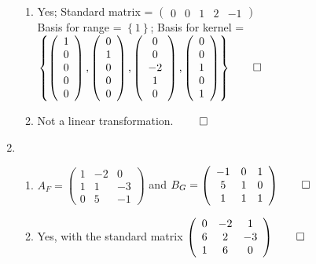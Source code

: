 \documentclass[12pt, a4paper]{article}
\begin{document}
\begin{enumerate}[Q\arabic*.]
\begin{enumerate}[(\alph*)]
      \item Yes; Standard matrix = $\left(\begin{array}{ccccc} 0&0&1&2&-1 \end{array}\right)$\\ Basis for range = $\left\{ 1\right\}$; Basis for kernel = $\left\{ \left(\begin{array}{c} 1\\0\\0\\0\\0 \end{array}\right),  \left(\begin{array}{c} 0\\1\\0\\0\\0 \end{array}\right),  \left(\begin{array}{c} 0\\0\\-2\\1\\0 \end{array}\right),  \left(\begin{array}{c}0 \\0\\1\\0\\1 \end{array}\right)\right\} \qed$

      \item Not a linear transformation. $\qed$
    \end{enumerate}

  \item
    \begin{enumerate}[(\alph*)]
      \item $A_F = \left(\begin{array}{ccc} 1 & -2 & 0\\ 1 & 1 & -3\\ 0 & 5 & -1 \end{array}\right)$ and $B_G = \left(\begin{array}{ccc} -1 & 0 & 1\\ 5 & 1 & 0\\ 1 & 1 & 1 \end{array}\right) \qed$

      \item Yes, with the standard matrix $\left(\begin{array}{ccc} 0 & -2 & 1\\ 6 & 2 & -3\\ 1 & 6 & 0 \end{array}\right) \qed$


\end{enumerate}
\end{enumerate}
\end{document}
